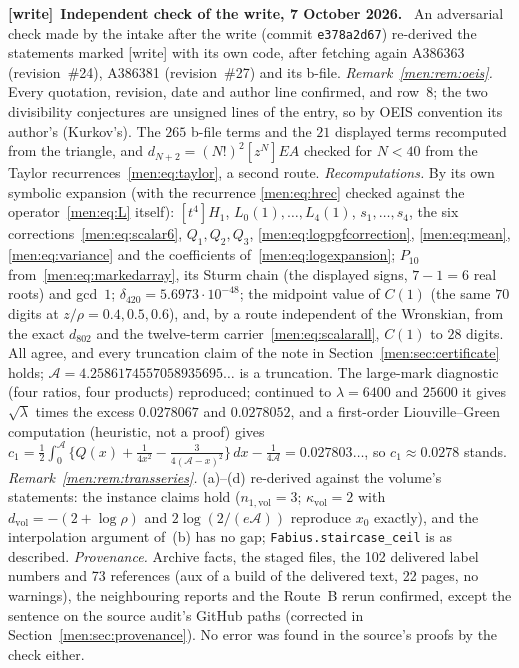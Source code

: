 \documentclass[11pt,letterpaper]{article}
\theoremstyle{remark}\newtheorem{remark}[theorem]{Remark}
\newcommand{\file}[1]{\nolinkurl{#1}}
\newenvironment{writenote}[1][]{\par\smallskip\begingroup\small
 \noindent\textbf{[write]}\if\relax\detokenize{#1}\relax\else~\textbf{#1.}\fi\ }%
 {\par\endgroup\smallskip}
\begin{document}
\begin{writenote}[Independent check of the write, 7 October 2026]
An adversarial check made by the intake after the write (commit
\file{e378a2d67}) re-derived the statements marked [write] with its own code,
after fetching again A386363 (revision~\#24), A386381 (revision~\#27) and its
b-file. \emph{Remark~\ref{men:rem:oeis}.} Every quotation, revision, date and
author line confirmed, and row~$8$; the two divisibility conjectures are
unsigned lines of the entry, so by OEIS convention its author's (Kurkov's).
The $265$ b-file terms and the $21$ displayed terms recomputed from the
triangle, and $d_{N+2}=(N!)^2[z^N]EA$ checked for $N<40$ from the Taylor
recurrences~\eqref{men:eq:taylor}, a second route.
\emph{Recomputations.} By its own symbolic expansion (with the recurrence
\eqref{men:eq:hrec} checked against the operator~\eqref{men:eq:L} itself):
$[t^4]H_1$, $L_0(1),\dots,L_4(1)$, $s_1,\dots,s_4$, the six
corrections~\eqref{men:eq:scalar6}, $Q_1,Q_2,Q_3$, \eqref{men:eq:logpgfcorrection},
\eqref{men:eq:mean}, \eqref{men:eq:variance} and the coefficients
of~\eqref{men:eq:logexpansion}; $P_{10}$ from~\eqref{men:eq:markedarray}, its
Sturm chain (the displayed signs, $7-1=6$ real roots) and gcd~$1$;
$\delta_{420}=5.6973\cdot10^{-48}$; the midpoint value of $C(1)$ (the same
$70$ digits at $z/\rho=0.4,0.5,0.6$), and, by a route independent of the
Wronskian, from the exact $d_{802}$ and the twelve-term
carrier~\eqref{men:eq:scalarall}, $C(1)$ to $28$ digits. All agree, and every
truncation claim of the note in Section~\ref{men:sec:certificate} holds;
$\mathcal A=4.2586174557058935695\ldots$ is a truncation. The large-mark
diagnostic (four ratios, four products) reproduced; continued to
$\lambda=6400$ and $25600$ it gives $\sqrt\lambda$ times the excess
$0.0278067$ and $0.0278052$, and a first-order Liouville--Green computation
(heuristic, not a proof) gives $c_1=\tfrac12\int_0^{\mathcal A}\{Q(x)+\tfrac1{4x^2}
-\tfrac3{4(\mathcal A-x)^2}\}\,dx-\tfrac1{4\mathcal A}=0.027803\ldots$, so
$c_1\approx0.0278$ stands. \emph{Remark~\ref{men:rem:transseries}.} (a)--(d)
re-derived against the volume's statements: the instance claims hold
($n_{1,\mathrm{vol}}=3$; $\kappa_{\mathrm{vol}}=2$ with
$d_{\mathrm{vol}}=-(2+\log\rho)$ and $2\log(2/(e\mathcal A))$ reproduce $x_0$
exactly), and the interpolation argument of~(b) has no gap;
\file{Fabius.staircase_ceil} is as described. \emph{Provenance.} Archive
facts, the staged files, the 102 delivered label numbers and 73 references
(aux of a build of the delivered text, 22 pages, no warnings), the
neighbouring reports and the Route~B rerun confirmed, except the sentence on
the source audit's GitHub paths (corrected in
Section~\ref{men:sec:provenance}). No error was found in the source's proofs
by the check either.
\end{writenote}
\end{document}
